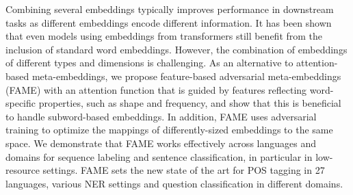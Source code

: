 Combining several embeddings typically improves performance in downstream tasks as different embeddings encode different information. It has been shown that even models using embeddings from transformers still benefit from the inclusion of standard word embeddings. However, the combination of embeddings of different types and dimensions is challenging. As an alternative to attention-based meta-embeddings, we propose feature-based adversarial meta-embeddings (FAME) with an attention function that is guided by features reflecting word-specific properties, such as shape and frequency, and show that this is beneficial to handle subword-based embeddings. In addition, FAME uses adversarial training to optimize the mappings of differently-sized embeddings to the same space. We demonstrate that FAME works effectively across languages and domains for sequence labeling and sentence classification, in particular in low-resource settings. FAME sets the new state of the art for POS tagging in 27 languages, various NER settings and question classification in different domains.
